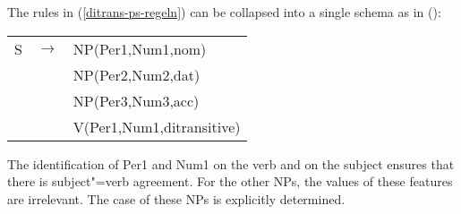 \noindent
The rules in (\ref{ditrans-ps-regeln})  can be collapsed into a single schema as in ():
\ea
\label{ditrans-schema}
\begin{tabular}[t]{@{}l@{ }l@{ }l}
S  & $\to$ & NP({Per1},{Num1},{nom}) \\
   &       & NP(Per2,Num2,{dat})\\
   &       & NP(Per3,Num3,{acc})\\
   &       & V({Per1},{Num1},ditransitive)\\
\end{tabular}
\z
The identification of Per1 and Num1 on the verb and on the subject ensures that there is subject"=verb agreement.
For the other NPs, the values of these features are irrelevant. The case of these NPs is explicitly determined.



